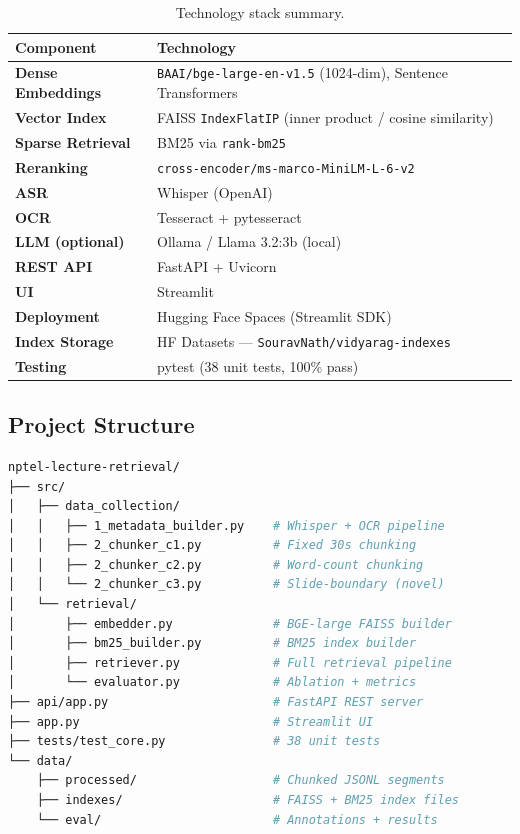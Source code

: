 \documentclass[12pt,a4paper]{article}
\begin{document}
\begin{table}[H]
\centering
\small
\caption{Technology stack summary.}
\label{tab:techstack}
\setlength{\tabcolsep}{6pt}
\begin{tabular}{>{\bfseries}p{3.2cm} p{9.8cm}}
\toprule
Component & Technology \\
\midrule
Dense Embeddings    & \texttt{BAAI/bge-large-en-v1.5} (1024-dim), Sentence Transformers \\
Vector Index        & FAISS \texttt{IndexFlatIP} (inner product / cosine similarity) \\
Sparse Retrieval    & BM25 via \texttt{rank-bm25} \\
Reranking           & \texttt{cross-encoder/ms-marco-MiniLM-L-6-v2} \\
ASR                 & Whisper (OpenAI) \\
OCR                 & Tesseract + pytesseract \\
LLM (optional)      & Ollama / Llama 3.2:3b (local) \\
REST API            & FastAPI + Uvicorn \\
UI                  & Streamlit \\
Deployment          & Hugging Face Spaces (Streamlit SDK) \\
Index Storage       & HF Datasets --- \texttt{SouravNath/vidyarag-indexes} \\
Testing             & pytest (38 unit tests, 100\% pass) \\
\bottomrule
\end{tabular}
\end{table}

\subsection{Project Structure}

\begin{lstlisting}[language=bash]
nptel-lecture-retrieval/
├── src/
│   ├── data_collection/
│   │   ├── 1_metadata_builder.py    # Whisper + OCR pipeline
│   │   ├── 2_chunker_c1.py          # Fixed 30s chunking
│   │   ├── 2_chunker_c2.py          # Word-count chunking
│   │   └── 2_chunker_c3.py          # Slide-boundary (novel)
│   └── retrieval/
│       ├── embedder.py              # BGE-large FAISS builder
│       ├── bm25_builder.py          # BM25 index builder
│       ├── retriever.py             # Full retrieval pipeline
│       └── evaluator.py             # Ablation + metrics
├── api/app.py                       # FastAPI REST server
├── app.py                           # Streamlit UI
├── tests/test_core.py               # 38 unit tests
└── data/
    ├── processed/                   # Chunked JSONL segments
    ├── indexes/                     # FAISS + BM25 index files
    └── eval/                        # Annotations + results
\end{lstlisting}
\end{document}
